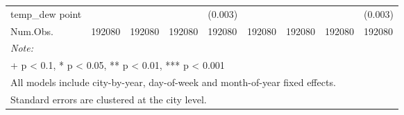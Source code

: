 \begin{landscape}
\begin{table}
{\begin{tabular}[t]{lllllllll}
\multirow{-2}{*}{\raggedright\arraybackslash temp_{dew point}} &  &  &  & (0.003) &  &  &  & (0.003)\\

Num.Obs. & 192080 & 192080 & 192080 & 192080 & 192080 & 192080 & 192080 & 192080\\
\bottomrule
\multicolumn{9}{l}{\rule{0pt}{1em}\textit{Note: }}\\
\multicolumn{9}{l}{\rule{0pt}{1em}+ p < 0.1, * p < 0.05, ** p < 0.01, *** p < 0.001}\\
\multicolumn{9}{l}{\rule{0pt}{1em}All models include city-by-year, day-of-week and month-of-year fixed effects.}\\
\multicolumn{9}{l}{\rule{0pt}{1em}Standard errors are clustered at the city level.}\\
\end{tabular}}
\end{table}
\end{landscape}
